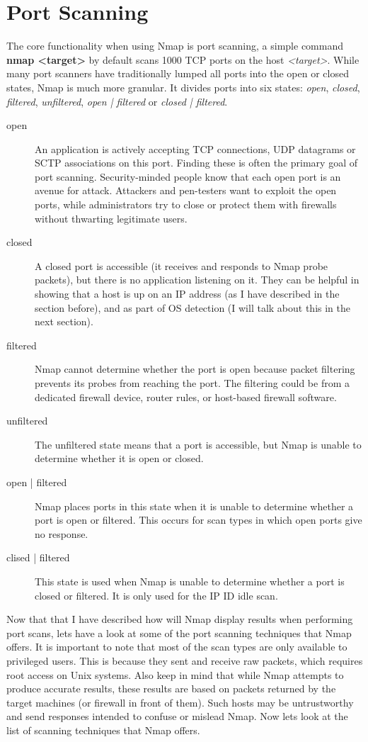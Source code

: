 \documentclass[times, utf8, seminar,english]{fer}
\begin{document}
\section{Port Scanning}
The core functionality when using Nmap is port scanning, a simple command \textbf{nmap <target>} by default scans 1000 TCP ports on the host \textit{<target>}. While many port scanners have traditionally lumped all ports into the open or closed states, Nmap is much more granular. It divides ports into six states: \textit{open}, \textit{closed}, \textit{filtered}, \textit{unfiltered}, \textit{open | filtered} or \textit{closed | filtered}.
\newline
\begin{description}
	\item [open] An application is actively accepting TCP connections, UDP datagrams or SCTP associations on this port. Finding these is often the primary goal of port scanning. Security-minded people know that each open port is an avenue for attack. Attackers and pen-testers want to exploit the open ports, while administrators try to close or protect them with firewalls without thwarting legitimate users.
	\item [closed] A closed port is accessible (it receives and responds to Nmap probe packets), but there is no application listening on it. They can be helpful in showing that a host is up on an IP address (as I have described in the section before), and as part of OS detection (I will talk about this in the next section). 
	\item [filtered] Nmap cannot determine whether the port is open because packet filtering prevents its probes from reaching the port. The filtering could be from a dedicated firewall device, router rules, or host-based firewall software. 
	\item [unfiltered] The unfiltered state means that a port is accessible, but Nmap is unable to determine whether it is open or closed.
	\item [open | filtered] Nmap places ports in this state when it is unable to determine whether a port is open or filtered. This occurs for scan types in which open ports give no response.
	\item [clised | filtered] This state is used when Nmap is unable to determine whether a port is closed or filtered. It is only used for the IP ID idle scan.
\end{description}
Now that that I have described how will Nmap display results when performing port scans, lets have a look at some of the port scanning techniques that Nmap offers. It is important to note that most of the scan types are only available to privileged users. This is because they sent and receive raw packets, which requires root access on Unix systems. Also keep in mind that while Nmap attempts to produce accurate results, these results are based on packets returned by the target machines (or firewall in front of them). Such hosts may be untrustworthy and send responses intended to confuse or mislead Nmap. Now lets look at the list of scanning techniques that Nmap offers.
\end{document}
